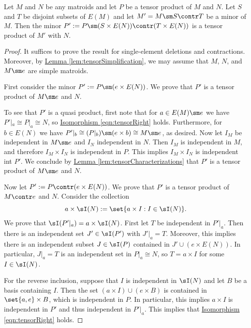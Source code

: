     \begin{proposition}\label{prop:tensorMinorClosed}
        Let $M$ and $N$ be any matroids and let $P$ be a tensor product of $M$ and $N$. Let $S$ and $T$ be disjoint subsets of $E(M)$ and let $M'= M\sm S\contr T$ be a minor of $M$. Then the minor $P':=P\sm (S\times E(N))\contr (T\times E(N))$ is a tensor product of $M'$ with $N$.
    \end{proposition}
    \begin{proof}
        It suffices to prove the result for single-element deletions and contractions. Moreover, by \hyperref[lem:tensorSimplification]{Lemma \ref{lem:tensorSimplification}}, we may assume that $M$, $N$, and $M\sm e$ are simple matroids.

        First consider the minor $P':=P\sm(e\times E(N))$. We prove that $P'$ is a tensor product of $M\sm e$ and $N$.
        
        To see that $P'$ is a quasi product, first note that for $a\in E(M)\sm e$ we have $P'|_a\cong P|_a\cong N$, so \hyperref[eqn:tensorRight]{Isomorphism \ref*{eqn:tensorRight}} holds. Furthermore, for $b\in E(N)$ we have $P'|_b\cong (P|_b)\sm (e\times b)\cong M\sm e$, as desired. Now let $I_M$ be independent in $M\sm e$ and $I_N$ independent in $N$. Then $I_M$ is independent in $M$, and therefore $I_M\times I_N$ is independent in $P$. This implies $I_M\times I_N$ is independent int $P'$. We conclude by \hyperref[lem:tensorCharacterizations]{Lemma \ref*{lem:tensorCharacterizations}} that $P'$ is a tensor product of $M\sm e$ and $N$.

        Now let $P':=P\contr (e\times E(N))$. We prove that $P'$ is a tensor product of $M\contr e$ and $N$. Consider the collection 
        $$a\times \sI(N):=\set{a\times I: I\in \sI(N)}.$$
        We prove that $\sI(P'|_a)= a\times \sI(N)$. First let $T$ be independent in $P'|_a$. Then there is an independent set $J'\in \sI(P')$ with $J'|_a=T$. Moreover, this implies there is an independent subset $J\in \sI(P)$ contained in $J'\cup (e\times E(N))$. In particular, $J|_a=T$ is an independent set in $P|_a\cong N$, so $T= a\times I$ for some $I\in \sI(N)$.

        For the reverse inclusion, suppose that $I$ is independent in $\sI(N)$ and let $B$ be a basis containing $I$. Then the set $(a\times I)\cup (e\times B)$ is contained in $\set{a,e}\times B$, which is independent in $P$. In particular, this implies $a\times I$ is independent in $P'$ and thus independent in $P'|_a$. This implies that \hyperref[eqn:tensorRight]{Isomorphism \ref*{eqn:tensorRight}} holds.


\end{proof}
